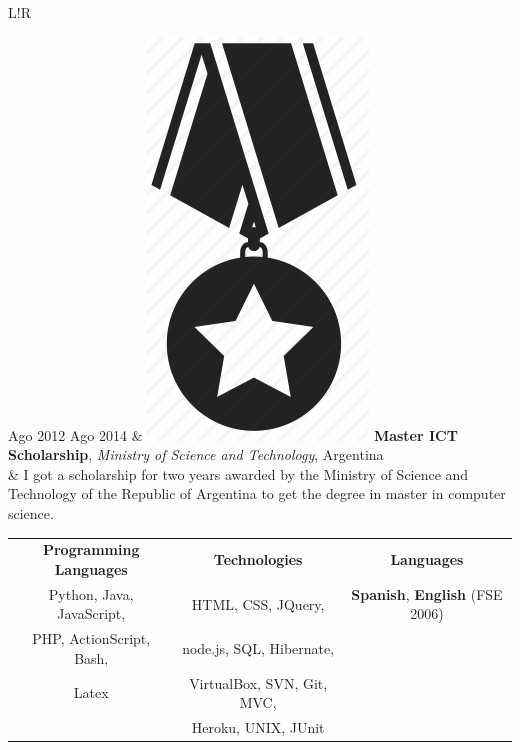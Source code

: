 \documentclass[10pt]{article}
\newcommand\VRule{\color{lightgray}\vrule width 0.5pt}
\begin{document}
\begin{tabular}{L!{\VRule}R}

Ago 2012 Ago 2014 & \includegraphics[scale=0.022]{../img/medal.png}
\textbf{Master ICT Scholarship}, \textit{Ministry of Science and 
Technology}, Argentina\\
& \vspace{-0.7cm} I got a scholarship for two years awarded by the Ministry of 
Science and Technology of the Republic of Argentina to
get the degree in master in computer science.\\
\end{tabular}


\vspace{1em}
\begin{tabular}{ccc}
\textbf{Programming Languages} & \textbf{Technologies} & \textbf{Languages}\\
Python, Java, JavaScript, 
 & HTML, CSS, JQuery,
 & {\bf Spanish}, {\bf English} (FSE 2006) \\
  PHP, ActionScript, Bash, & node.js, SQL, Hibernate, & \\
Latex & VirtualBox, SVN, Git, MVC, & \\
 &  Heroku, UNIX, JUnit & \\
\end{tabular}
\end{document}
